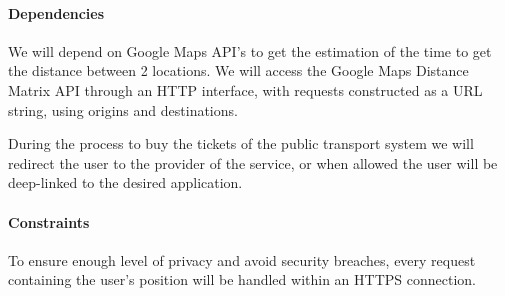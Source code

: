 \paragraph{Dependencies}
\begin{description}
\item We will depend on Google Maps API’s to get the estimation of the time to get the distance between 2 locations. 
We will access the Google Maps Distance Matrix API through an HTTP interface, with requests constructed as a URL string, using origins and destinations.
\item During the process to buy the tickets of the public transport system we will redirect the user to the provider of the service, or when allowed the user will be deep-linked to the desired application.
\end{description}


\paragraph{Constraints}
\begin{description}
\item To ensure enough level of privacy and avoid security breaches, every request containing the user’s position will be handled within an HTTPS connection.
\end{description}
